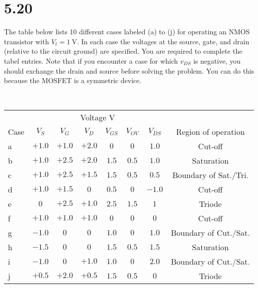 \documentclass[12pt, a4paper]{article}
\begin{document}
\section{5.20}
The table below lists 10 different cases labeled (a) to (j) for operating an NMOS transistor with $V_t = \SI{1}{\V} $. In each case the voltages at the source, gate, and drain (relative to the circuit ground) are specified. You are required to complete the tabel entries. Note that if you encounter a case for which $v_{DS}$ is negative, you should exchange the drain and source before solving the problem. You can do this because the MOSFET is a symmetric device.


\Ans \\
\begin{center}
  \begin{tabular}{|l|c|c|c|c|c|c|c|}
    \hline
    & \multicolumn{6}{c|}{Voltage \si\V} & \\ \cline{2-7}
    Case & $V_S$ & $V_G$ & $V_D$ & $V_{GS}$ & $V_{OV}$ & $V_{DS}$ & Region of operation \\
    \hline
    a & $+1.0$ & $+1.0$ & $+2.0$ & $0$ & $0$ & $1.0$ & Cut-off \\
    b & $+1.0$ & $+2.5$ & $+2.0$ & $1.5$ & $0.5$ & $1.0$ & Saturation \\
    c & $+1.0$ & $+2.5$ & $+1.5$ & $1.5$ & $0.5$ & $0.5$ & Boundary of Sat./Tri. \\
    d & $+1.0$ & $+1.5$ & $0$ & $0.5$ & $0$ & $-1.0$ & Cut-off \\
    e & $0$ & $+2.5$ & $+1.0$ & $2.5$ & $1.5$ & $1$ & Triode \\
    f & $+1.0$ & $+1.0$ & $+1.0$ & $0$ & $0$ & $0$ & Cut-off \\
    g & $-1.0$ & $0$ & $0$ & $1.0$ & $0$ & $1.0$ & Boundary of Cut./Sat. \\
    h & $-1.5$ & $0$ & $0$ & $1.5$ & $0.5$ & $1.5$ & Saturation \\
    i & $-1.0$ & $0$ & $+1.0$ & $1.0$ & $0$ & $2.0$ & Boundary of Cut./Sat. \\
    j & $+0.5$ & $+2.0$ & $+0.5$ & $1.5$ & $0.5$ & $0$ & Triode \\
    \hline
  \end{tabular}
\end{center}

\clearpage
\end{document}
